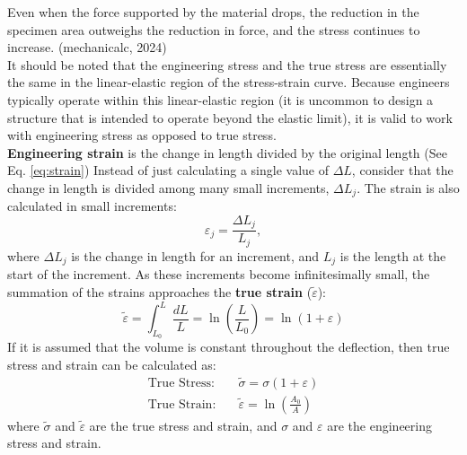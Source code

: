 \documentclass{article}
\begin{document}
    Even when the force supported by the material drops, the reduction in the specimen area outweighs the reduction in force, and the stress continues to increase. (mechanicalc, 2024)    \\[8pt]
    It should be noted that the engineering stress and the true stress are essentially the same in the linear-elastic region of the stress-strain curve. Because engineers typically operate within this linear-elastic region (it is uncommon to design a structure that is intended to operate beyond the elastic limit), it is valid to work with engineering stress as opposed to true stress.\\[8pt]
    \textbf{Engineering strain} is the change in length divided by the original length (See Eq. \ref{eq:strain}) Instead of just calculating a single value of $\Delta L$, consider that the change in length is divided among many small increments, $\Delta L_j$. The strain is also calculated in small increments:
    \begin{equation}
        \varepsilon_j = \frac{\Delta L_j}{L_j},
    \end{equation}
    where $\Delta L_j$ is the change in length for an increment, and $L_j$ is the length at the start of the increment. As these increments become infinitesimally small, the summation of the strains approaches the \textbf{true strain} ($\tilde{\varepsilon}$):
    \begin{equation}
        \tilde{\varepsilon} = \int_{L_0}^{L} \frac{dL}{L}=\ln\left(\frac{L}{L_0}\right)=\ln(1+\varepsilon)
    \end{equation}
    If it is assumed that the volume is constant throughout the deflection, then true stress and strain can be calculated as:
    \begin{align}
        \text{True Stress:} & \quad \tilde{\sigma} = \sigma \left( 1 + \varepsilon \right) \\
        \text{True Strain:} & \quad \tilde{\varepsilon} = \ln \left(\frac{A_0}{A}\right)
    \end{align}
    where $\tilde{\sigma}$ and $\tilde{\varepsilon}$ are the true stress and strain, and $\sigma$ and $\varepsilon$ are the engineering stress and strain.
    \newpage
\end{document}
